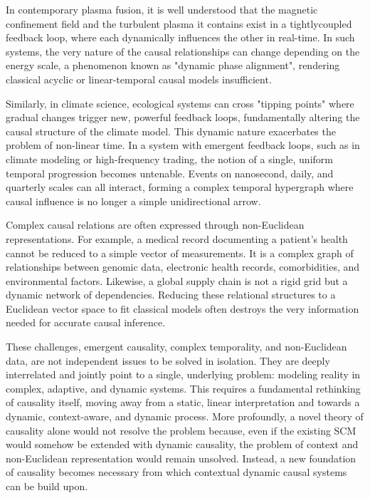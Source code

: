 In contemporary plasma fusion, it is well understood that the magnetic confinement field and the turbulent plasma it contains exist in a tightly\-coupled feedback loop, where each dynamically influences the other in real-time. In such systems, the very nature of the causal relationships can change depending on the energy scale, a phenomenon known as "dynamic phase alignment", rendering classical acyclic or linear-temporal causal models insufficient\cite{Milanese_2021}.

Similarly, in climate science, ecological systems can cross "tipping points" where gradual changes trigger new, powerful feedback loops, fundamentally altering the causal structure of the climate model. This dynamic nature exacerbates the problem of non-linear time. In a system with emergent feedback loops, such as in climate modeling or high-frequency trading, the notion of a single, uniform temporal progression becomes untenable. Events on nanosecond, daily, and quarterly scales can all interact, forming a complex temporal hypergraph where causal influence is no longer a simple unidirectional arrow. 

Complex causal relations are often expressed through non-Euclidean representations. 
For example, a medical record documenting a patient's health cannot be reduced to a simple vector of measurements. 
It is a complex graph of relationships between genomic data, electronic health records, comorbidities, and environmental factors. 
Likewise, a global supply chain is not a rigid grid but a dynamic network of dependencies. Reducing these relational structures to a Euclidean vector space to fit classical models often destroys the very information needed for accurate causal inference. 

These challenges, emergent causality, complex temporality, and non-Euclidean data, are not independent issues to be solved in isolation. They are deeply interrelated and jointly point to a single, underlying problem: modeling reality in complex, adaptive, and dynamic systems. This requires a fundamental rethinking of causality itself, moving away from a static, linear interpretation and towards a dynamic, context-aware, and dynamic process. More profoundly, a novel theory of causality alone would not resolve the problem because, even if the existing SCM would somehow be extended with dynamic causality, the problem of context and non-Euclidean representation would remain unsolved. Instead, a new foundation of causality becomes necessary from which contextual dynamic causal systems can be build upon. 

\newpage

 